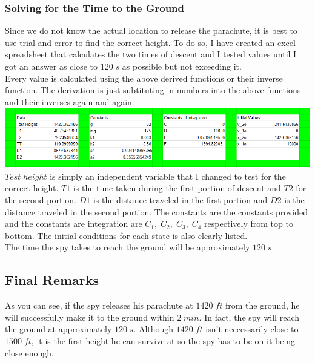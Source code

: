 \documentclass{article}
\begin{document}
	\subsubsection{Solving for the Time to the Ground}
	Since we do not know the actual location to release the parachute, it is best to use trial and error to find the correct height. To do so, I have created an excel spreadsheet that calculates the two times of descent and I tested values until I got an answer as close to $120\;s$ as possible but not exceeding it. \\
	Every value is calculated using the above derived functions or their inverse function. The derivation is just subtituting in numbers into the above functions and their inverses again and again.\\
	\includegraphics[scale=0.75]{images/p6tne.PNG}
	$Test\; height$ is simply an independent variable that I changed to test for the correct height. $T1$ is the time taken during the first portion of descent and $T2$ for the second portion. $D1$ is the distance traveled in the first portion and $D2$ is the distance traveled in the second portion. The constants are the constants provided and the constants are integration are $C_1,\; C_2,\; C_3,\; C_4$ respectively from top to bottom. The initial conditions for each state is also clearly listed.\\
	The time the spy takes to reach the ground will be approximately $120\;s$.
	\subsection{Final Remarks}
	As you can see, if the spy releases his parachute at $1420\;ft$ from the ground, he will successfully make it to the ground within $2\;min$. In fact, the spy will reach the ground at approximately $120\;s$. Although $1420\;ft$ isn't neccessarily close to $1500\;ft$, it is the first height he can survive at so the spy has to be on it being close enough.
\end{document}
